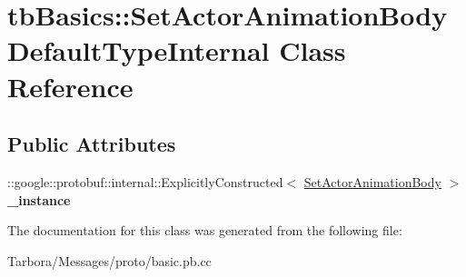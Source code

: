 \hypertarget{classtbBasics_1_1SetActorAnimationBodyDefaultTypeInternal}{}\section{tb\+Basics\+:\+:Set\+Actor\+Animation\+Body\+Default\+Type\+Internal Class Reference}
\label{classtbBasics_1_1SetActorAnimationBodyDefaultTypeInternal}
\subsection*{Public Attributes}
\begin{DoxyCompactItemize}
\item 
\mbox{\label{classtbBasics_1_1SetActorAnimationBodyDefaultTypeInternal_ace933274e81c04dfd570c1a9326a9356}} 
\+::google\+::protobuf\+::internal\+::\+Explicitly\+Constructed$<$ \hyperlink{classtbBasics_1_1SetActorAnimationBody}{Set\+Actor\+Animation\+Body} $>$ {\bfseries \+\_\+instance}
\end{DoxyCompactItemize}


The documentation for this class was generated from the following file\+:\begin{DoxyCompactItemize}
\item 
Tarbora/\+Messages/proto/basic.\+pb.\+cc\end{DoxyCompactItemize}
